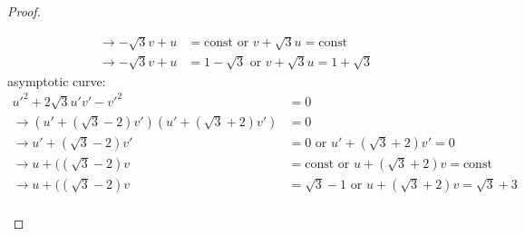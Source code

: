 \documentclass[10pt,a4paper]{article}
\begin{document}
\begin{proof}
\begin{enumerate}[{ (}a{)}]
\begin{align*}
\rightarrow -\sqrt{3}v+u&=\textrm{const or }v+\sqrt{3}u=\textrm{const} \\
\rightarrow -\sqrt{3}v+u&=1-\sqrt{3}\textrm{ or }v+\sqrt{3}u=1+\sqrt{3}
\end{align*}
asymptotic curve:
\begin{align*}
u'^2+2\sqrt{3}u'v'-v'^2&=0\\
\rightarrow (u'+(\sqrt{3}-2)v')(u'+(\sqrt{3}+2)v')&=0\\
\rightarrow u'+(\sqrt{3}-2)v'&=0\textrm{ or }u'+(\sqrt{3}+2)v'=0\\
\rightarrow u+((\sqrt{3}-2)v&=\textrm{const or }u+(\sqrt{3}+2)v=\textrm{const}\\
\rightarrow u+((\sqrt{3}-2)v&=\sqrt{3}-1\textrm{ or }u+(\sqrt{3}+2)v=\sqrt{3}+3\\
\end{align*}
\end{enumerate}
\end{proof}
\end{document}

